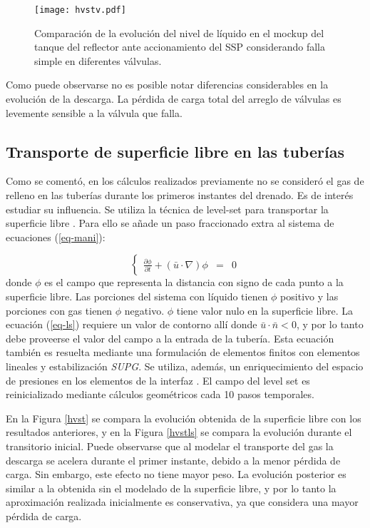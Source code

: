 \begin{figure}[ht]
\centering
\texttt{[image: hvstv.pdf]}
\caption{Comparación de la evolución del nivel de líquido en el mockup del tanque del reflector
ante accionamiento del SSP considerando falla simple en diferentes válvulas.}
\label{hvstv} 
\end{figure}

Como puede observarse no es posible notar diferencias considerables en la evolución de la descarga.
La pérdida de carga total del arreglo de válvulas es levemente sensible a la válvula que falla.

\subsection*{Transporte de superficie libre en las tuberías}
\label{3:level-set}

Como se comentó, en los cálculos realizados previamente no se consideró el gas de relleno en las tuberías durante los primeros instantes del drenado.
Es de interés estudiar su influencia.
Se utiliza la técnica de level-set para transportar la superficie libre \cite{level-set}.
Para ello se añade un paso fraccionado extra al sistema de ecuaciones (\ref{eq-mani}):

\begin{equation}
\left\{ \begin{array}{rcl}
\displaystyle \frac{\partial\phi}{\partial t}+ (\bar{u} \cdot \nabla) \phi &=& 0
\label{eq-ls}
\end{array} \right.
\end{equation}
donde $\phi$ es el campo que representa la distancia con signo de cada punto a la superficie libre.
Las porciones del sistema con líquido tienen $\phi$ positivo y las porciones con gas tienen $\phi$ negativo.
$\phi$ tiene valor nulo en la superficie libre.
La ecuación (\ref{eq-ls}) requiere un valor de contorno allí donde $\bar{u} \cdot \bar{n} < 0$,
y por lo tanto debe proveerse el valor del campo a la entrada de la tubería.
Esta ecuación también es resuelta mediante una formulación de elementos finitos con elementos lineales y estabilización \textit{SUPG}.
Se utiliza, además, un enriquecimiento del espacio de presiones en los elementos de la interfaz \cite{enriq}.
El campo del level set es reinicializado mediante cálculos geométricos cada 10 pasos temporales.

En la Figura \ref{hvst} se compara la evolución obtenida de la superficie libre con los resultados anteriores,
y en la Figura \ref{hvstls} se compara la evolución durante el transitorio inicial.
Puede observarse que al modelar el transporte del gas la descarga se acelera durante el primer instante, debido a la menor pérdida de carga.
Sin embargo, este efecto no tiene mayor peso.
La evolución posterior es similar a la obtenida sin el modelado de la superficie libre,
y por lo tanto la aproximación realizada inicialmente es conservativa, ya que considera una mayor pérdida de carga.

